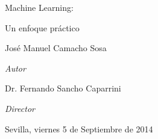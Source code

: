 {

\thispagestyle{empty}

\vspace*{30mm}

\begin{center}
\raggedleft
{\Huge \sc
Machine Learning:}
\end{center}

\begin{center}
\raggedleft
{\Huge \sc
Un enfoque práctico}
\end{center}

\vspace*{120mm}

\begin{center}
\raggedright
José Manuel Camacho Sosa
\end{center}

\vspace*{-8mm}

\begin{center}
\raggedright
\emph{Autor}
\end{center}

\vspace*{-21mm}

\begin{center}
\raggedleft
Dr. Fernando Sancho Caparrini
\end{center}

\vspace*{-8mm}

\begin{center}
\raggedleft
\emph{Director}
\end{center}

\vspace*{-5mm}

\begin{center}
\raggedleft
Sevilla, viernes 5 de Septiembre de 2014
\end{center}

\newpage
\thispagestyle{empty}
\mbox{ }

}
